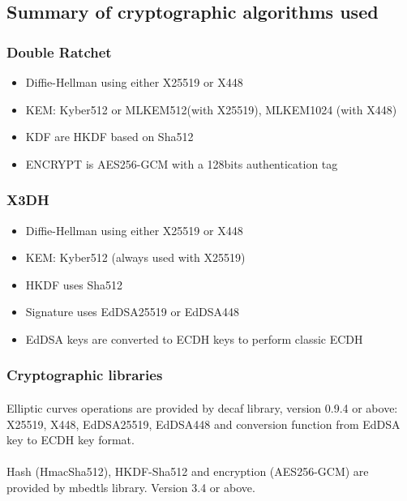 \documentclass[a4paper,11pt]{article}
\begin{document}
  \subsection{Summary of cryptographic algorithms used}
    \subsubsection{Double Ratchet}
      \begin{itemize}
        \item Diffie-Hellman using either X25519 or X448
        \item KEM: Kyber512 or MLKEM512(with X25519), MLKEM1024 (with X448)
        \item KDF are HKDF\cite{rfc5869} based on Sha512
        \item ENCRYPT is AES256-GCM with a 128bits authentication tag
      \end{itemize}
    \subsubsection{X3DH}
      \begin{itemize}
        \item Diffie-Hellman using either X25519 or X448
        \item KEM: Kyber512 (always used with X25519)
        \item HKDF uses Sha512
        \item Signature uses EdDSA25519 or EdDSA448
        \item EdDSA keys are converted to ECDH keys to perform classic ECDH
      \end{itemize}

  \subsubsection{Cryptographic libraries}
    \paragraph{}Elliptic curves operations are provided by decaf library\cite{libdecaf}, version 0.9.4 or above: X25519, X448, EdDSA25519, EdDSA448 and conversion function from EdDSA key to ECDH key format.
    \paragraph{}Hash (HmacSha512), HKDF-Sha512 and encryption (AES256-GCM) are provided by mbedtls library\cite{libmbedtls}. Version 3.4 or above.
\end{document}
